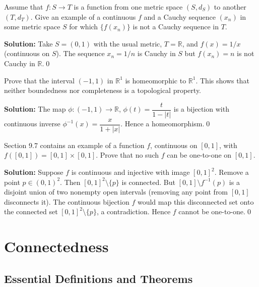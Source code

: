 \begin{problembox}
Assume that $f : S \rightarrow T$ is a function from one metric space $(S, d_S)$ to another $(T, d_T)$. Give an example of a continuous $f$ and a Cauchy sequence $(x_n)$ in some metric space $S$ for which $\{f(x_n)\}$ is not a Cauchy sequence in $T$.
\end{problembox}

\noindent\textbf{Solution:}
Take $S=(0,1)$ with the usual metric, $T=\mathbb{R}$, and $f(x)=1/x$ (continuous on $S$). The sequence $x_n=1/n$ is Cauchy in $S$ but $f(x_n)=n$ is not Cauchy in $\mathbb{R}$.\qed



\begin{problembox}
Prove that the interval $(-1, 1)$ in $\mathbb{R}^1$ is homeomorphic to $\mathbb{R}^1$. This shows that neither boundedness nor completeness is a topological property.
\end{problembox}

\noindent\textbf{Solution:}
The map $\phi:(-1,1)\to\mathbb{R}$, $\phi(t)=\dfrac{t}{1-|t|}$ is a bijection with continuous inverse $\phi^{-1}(x)=\dfrac{x}{1+|x|}$. Hence a homeomorphism.\qed



\begin{problembox}
Section 9.7 contains an example of a function $f$, continuous on $[0, 1]$, with $f([0, 1]) = [0, 1] \times [0, 1]$. Prove that no such $f$ can be one-to-one on $[0, 1]$.
\end{problembox}

\noindent\textbf{Solution:}
Suppose $f$ is continuous and injective with image $[0,1]^2$. Remove a point $p\in(0,1)^2$. Then $[0,1]^2\setminus\{p\}$ is connected. But $[0,1]\setminus f^{-1}(p)$ is a disjoint union of two nonempty open intervals (removing any point from $[0,1]$ disconnects it). The continuous bijection $f$ would map this disconnected set onto the connected set $[0,1]^2\setminus\{p\}$, a contradiction. Hence $f$ cannot be one-to-one.\qed

\section{Connectedness}

\subsection*{Essential Definitions and Theorems}


